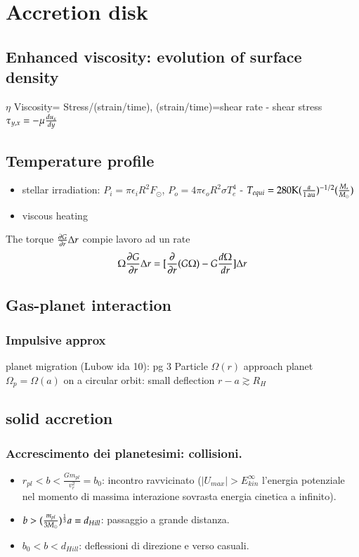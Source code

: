 \chapter{Accretion disk}

\section{Enhanced viscosity: evolution of surface density}

$\eta$ Viscosity= Stress/(strain/time), (strain/time)=shear rate - shear stress $\tau_{y,x}=-\mu\TDy{y}{u_x}$

\section{Temperature profile}
\begin{itemize}
\item stellar irradiation: $P_i=\pi\epsilon_iR^2F_{\odot}$, $P_o=4\pi\epsilon_oR^2\sigma T_e^4$ - $T_{equi}=280\si{\kelvin}(\frac{a}{\SI{1}{\astronomicalunit}})^{-1/2}(\frac{M_*}{\msun})$
\item viscous heating
\end{itemize}
The torque $\PDy{r}{G}\Delta r$ compie lavoro  ad un rate
\begin{equation*}
\Omega\PDy{r}{G}\Delta r=[\PDof{r}(G\Omega)-G\TDy{r}{\Omega}]\Delta r
\end{equation*}


\section{Gas-planet interaction}
 
\subsection{Impulsive approx}

planet migration (Lubow ida 10): pg 3
Particle $\Omega(r)$ approach planet $\Omega_p=\Omega(a)$ on a circular orbit: small deflection $r-a\gtrsim R_H$
 


\section{solid accretion}

\subsection{Accrescimento dei planetesimi: collisioni.}
\begin{itemize}
\item $r_{pl}<b<\frac{Gm_{pl}}{v_r^2}=b_0$: incontro ravvicinato ($|U_{max}|>E_{kin}^{\infty}$ l'energia potenziale nel momento di massima interazione sovrasta energia cinetica a infinito).
\item $b>(\frac{m_{pl}}{3\msun{}})\expy{\frac{1}{3}}a=d_{Hill}$: passaggio a grande distanza.
\item $b_0<b<d_{Hill}$: deflessioni di direzione e verso casuali.
\end{itemize}

